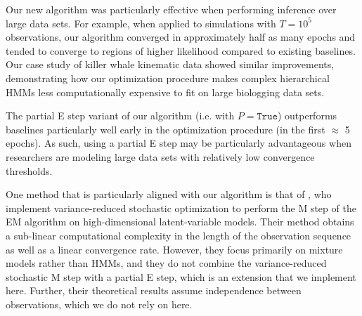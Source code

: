 Our new algorithm was particularly effective when performing inference over large data sets. For example, when applied to simulations with $T=10^{5}$ observations, our algorithm converged in approximately half as many epochs and tended to converge to regions of higher likelihood compared to existing baselines. Our case study of killer whale kinematic data showed similar improvements, demonstrating how our optimization procedure makes complex hierarchical HMMs less computationally expensive to fit on large biologging data sets.

The partial E step variant of our algorithm (i.e. with $P = \texttt{True}$) outperforms baselines particularly well early in the optimization procedure (in the first $\approx$ 5 epochs). As such, using a partial E step may be particularly advantageous when researchers are modeling large data sets with relatively low convergence thresholds.

One method that is particularly aligned with our algorithm is that of \citet{Zhu:2017}, who implement variance-reduced stochastic optimization to perform the M step of the EM algorithm on high-dimensional latent-variable models. Their method obtains a sub-linear computational complexity in the length of the observation sequence as well as a linear convergence rate. However, they focus primarily on mixture models rather than HMMs, and they do not combine the variance-reduced stochastic M step with a partial E step, which is an extension that we implement here. Further, their theoretical results assume independence between observations, which we do not rely on here.



